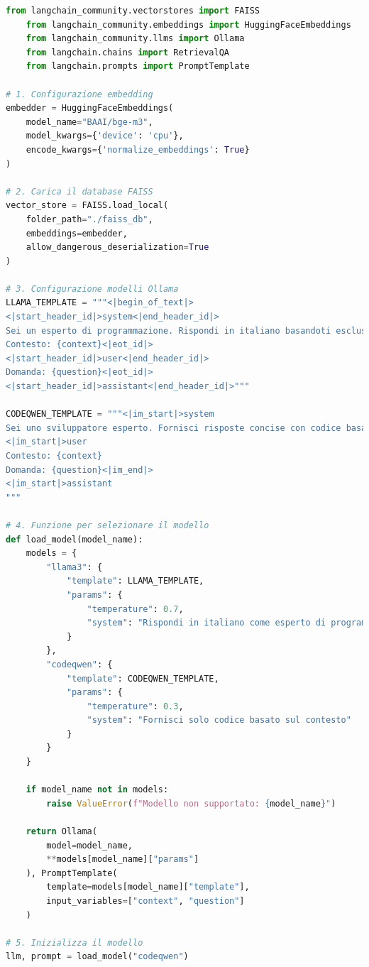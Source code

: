 \documentclass[12pt,a4paper,openright,twoside]{book}
\begin{document}
\begin{lstlisting}[language=Python, caption={Codice Python per la creazione della pipeline RAG}, label={lst:rag}]
    from langchain_community.vectorstores import FAISS
    from langchain_community.embeddings import HuggingFaceEmbeddings
    from langchain_community.llms import Ollama
    from langchain.chains import RetrievalQA
    from langchain.prompts import PromptTemplate
    
# 1. Configurazione embedding
embedder = HuggingFaceEmbeddings(
    model_name="BAAI/bge-m3",
    model_kwargs={'device': 'cpu'},
    encode_kwargs={'normalize_embeddings': True}
)

# 2. Carica il database FAISS
vector_store = FAISS.load_local(
    folder_path="./faiss_db",
    embeddings=embedder,
    allow_dangerous_deserialization=True
)

# 3. Configurazione modelli Ollama
LLAMA_TEMPLATE = """<|begin_of_text|>
<|start_header_id|>system<|end_header_id|>
Sei un esperto di programmazione. Rispondi in italiano basandoti esclusivamente sul contesto fornito.
Contesto: {context}<|eot_id|>
<|start_header_id|>user<|end_header_id|>
Domanda: {question}<|eot_id|>
<|start_header_id|>assistant<|end_header_id|>"""

CODEQWEN_TEMPLATE = """<|im_start|>system
Sei uno sviluppatore esperto. Fornisci risposte concise con codice basato sul contesto.<|im_end|>
<|im_start|>user
Contesto: {context}
Domanda: {question}<|im_end|>
<|im_start|>assistant
"""

# 4. Funzione per selezionare il modello
def load_model(model_name):
    models = {
        "llama3": {
            "template": LLAMA_TEMPLATE,
            "params": {
                "temperature": 0.7,
                "system": "Rispondi in italiano come esperto di programmazione"
            }
        },
        "codeqwen": {
            "template": CODEQWEN_TEMPLATE,
            "params": {
                "temperature": 0.3,
                "system": "Fornisci solo codice basato sul contesto"
            }
        }
    }
    
    if model_name not in models:
        raise ValueError(f"Modello non supportato: {model_name}")
    
    return Ollama(
        model=model_name,
        **models[model_name]["params"]
    ), PromptTemplate(
        template=models[model_name]["template"],
        input_variables=["context", "question"]
    )

# 5. Inizializza il modello
llm, prompt = load_model("codeqwen")


\end{lstlisting}
\end{document}

